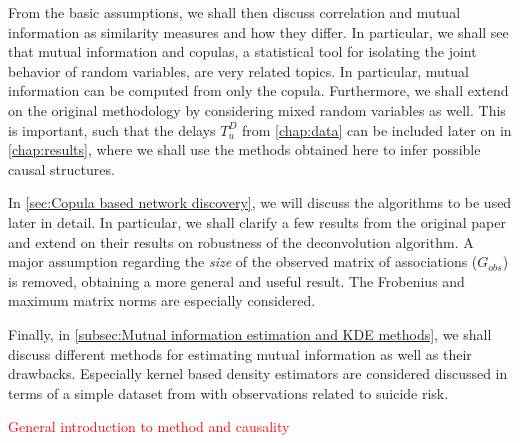 \documentclass[../Thesis.tex]{subfiles}
\begin{document}
From the basic assumptions, we shall then discuss correlation and mutual information as similarity measures and how they differ. In particular, we shall see that mutual information and copulas, a statistical tool for isolating the joint behavior of random variables, are very related topics. In particular, mutual information can be computed from only the copula. Furthermore, we shall extend on the original methodology by considering mixed random variables as well. This is important, such that the delays $T^D_u$ from \autoref{chap:data} can be included later on in \autoref{chap:results}, where we shall use the methods obtained here to infer possible causal structures.

In \autoref{sec:Copula based network discovery}, we will discuss the algorithms to be used later in detail. In particular, we shall clarify a few results from the original paper \cite{Network-deconvolution-as-a-general-method-to-distinguish-direct-dependencies-in-networks} and extend on their results on robustness of the deconvolution algorithm. A major assumption regarding the \textit{size} of the observed matrix of associations ($G_{obs}$) is removed, obtaining a more general and useful result. The Frobenius and maximum matrix norms are especially considered.

Finally, in \autoref{subsec:Mutual information estimation and KDE methods}, we shall discuss different methods for estimating mutual information as well as their drawbacks. Especially kernel based density estimators are considered discussed in terms of a simple dataset from \cite{Density-Estimation-and-Suicide-Risks-in-Psychiatric-Treatment} with observations related to suicide risk.


\textcolor{red}{General introduction to method and causality}
\end{document}
